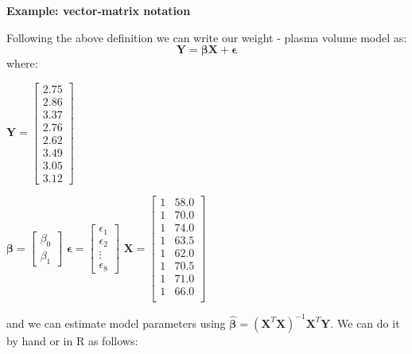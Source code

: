 \documentclass[
]{book}
\theoremstyle{definition}
\theoremstyle{definition}
\theoremstyle{definition}
\theoremstyle{remark}
\begin{document}
\textbf{Example: vector-matrix notation}

Following the above definition we can write our weight - plasma volume model as:
\[\mathbf{Y} = \boldsymbol\beta\mathbf{X} + \boldsymbol\epsilon\]
where:

\(\mathbf{Y}=\begin{bmatrix}  2.75 \\ 2.86 \\ 3.37 \\ 2.76 \\ 2.62 \\ 3.49 \\ 3.05 \\ 3.12 \end{bmatrix}\)

\(\boldsymbol\beta=\begin{bmatrix}  \beta_0 \\  \beta_1 \end{bmatrix}\)
\(\boldsymbol\epsilon=\begin{bmatrix}  \epsilon_1 \\  \epsilon_2 \\  \vdots \\  \epsilon_{8} \end{bmatrix}\)
\(\mathbf{X}=\begin{bmatrix}  1 & 58.0 \\  1 & 70.0 \\  1 & 74.0 \\  1 & 63.5 \\  1 & 62.0 \\  1 & 70.5 \\  1 & 71.0 \\  1 & 66.0 \\ \end{bmatrix}\)

and we can estimate model parameters using \(\hat{\mathbf{\beta}}= (\mathbf{X}^T\mathbf{X})^{-1}\mathbf{X}^T\mathbf{Y}\). We can do it by hand or in R as follows:
\end{document}
